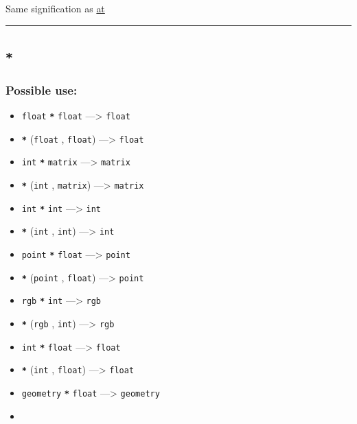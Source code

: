 \documentclass[]{book}
\providecommand{\tightlist}{%
  \setlength{\itemsep}{0pt}\setlength{\parskip}{0pt}}
\theoremstyle{definition}
\theoremstyle{definition}
\theoremstyle{definition}
\theoremstyle{remark}
\begin{document}
Same signification as \href{operators-a-to-a.html\#at}{at}

\begin{center}\rule{0.5\linewidth}{\linethickness}\end{center}

\subsection{\texorpdfstring{\texttt{*}}{*}}\label{section-10}

\subsubsection{Possible use:}\label{possible-use-9}

\begin{itemize}
\tightlist
\item
  \texttt{float} \textbf{\texttt{*}} \texttt{float} ---\textgreater{}
  \texttt{float}
\item
  \textbf{\texttt{*}} (\texttt{float} , \texttt{float})
  ---\textgreater{} \texttt{float}
\item
  \texttt{int} \textbf{\texttt{*}} \texttt{matrix} ---\textgreater{}
  \texttt{matrix}
\item
  \textbf{\texttt{*}} (\texttt{int} , \texttt{matrix}) ---\textgreater{}
  \texttt{matrix}
\item
  \texttt{int} \textbf{\texttt{*}} \texttt{int} ---\textgreater{}
  \texttt{int}
\item
  \textbf{\texttt{*}} (\texttt{int} , \texttt{int}) ---\textgreater{}
  \texttt{int}
\item
  \texttt{point} \textbf{\texttt{*}} \texttt{float} ---\textgreater{}
  \texttt{point}
\item
  \textbf{\texttt{*}} (\texttt{point} , \texttt{float})
  ---\textgreater{} \texttt{point}
\item
  \texttt{rgb} \textbf{\texttt{*}} \texttt{int} ---\textgreater{}
  \texttt{rgb}
\item
  \textbf{\texttt{*}} (\texttt{rgb} , \texttt{int}) ---\textgreater{}
  \texttt{rgb}
\item
  \texttt{int} \textbf{\texttt{*}} \texttt{float} ---\textgreater{}
  \texttt{float}
\item
  \textbf{\texttt{*}} (\texttt{int} , \texttt{float}) ---\textgreater{}
  \texttt{float}
\item
  \texttt{geometry} \textbf{\texttt{*}} \texttt{float} ---\textgreater{}
  \texttt{geometry}
\item

\end{itemize}
\end{document}
